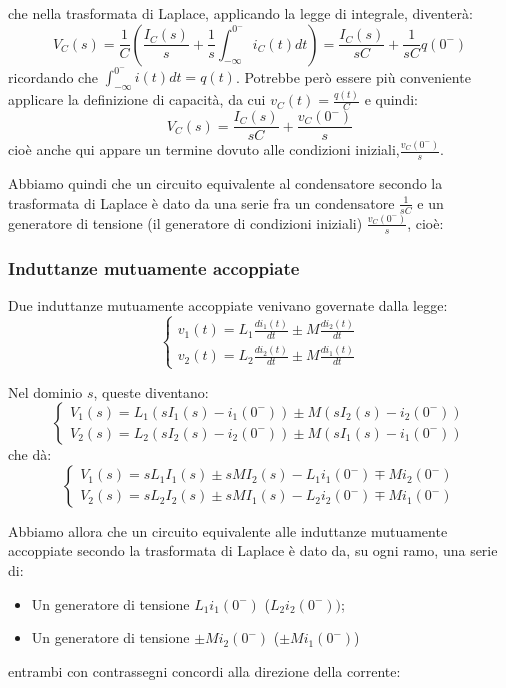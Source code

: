 \documentclass[a4paper,11pt]{article}
\begin{document}
che nella trasformata di Laplace, applicando la legge di integrale, diventerà:
$$
V_C(s) = \frac{1}{C} \left( \frac{I_C(s)}{s} + \frac{1}{s}\int_{-\infty}^{0^-}i_C(t)dt \right) = \frac{I_C(s)}{sC} + \frac{1}{sC} q(0^-)
$$
ricordando che $\int_{-\infty}^{0^-} i(t) dt = q(t)$.
Potrebbe però essere più conveniente applicare la definizione di capacità, da cui $v_C(t) = \frac{q(t)}{C}$ e quindi:
$$
V_C(s) = \frac{I_C(s)}{sC} + \frac{v_C(0^-)}{s}
$$
cioè anche qui appare un termine dovuto alle condizioni iniziali,$ \frac{v_C(0^-)}{s}$.

Abbiamo quindi che un circuito equivalente al condensatore secondo la trasformata di Laplace è dato da una serie fra un condensatore $\frac{1}{sC}$ e un generatore di tensione (il generatore di condizioni iniziali) $\frac{v_C(0^-)}{s}$, cioè:

\begin{center}
\end{center}

\subsubsection{Induttanze mutuamente accoppiate}
Due induttanze mutuamente accoppiate venivano governate dalla legge:
\[
	\begin{cases}			
		v_1(t) = L_1 \frac{d i_1(t)}{dt} \pm M \frac{d i_2(t)}{dt} \\
		v_2(t) = L_2 \frac{d i_2(t)}{dt} \pm M \frac{d i_1(t)}{dt}
	\end{cases}
\]

Nel dominio $s$, queste diventano:
\[
	\begin{cases}
		V_1(s) = L_1 \left( s I_1(s) - i_1(0^-) \right) \pm M \left( s I_2(s) - i_2(0^-) \right) \\
		V_2(s) = L_2 \left( s I_2(s) - i_2(0^-) \right) \pm M \left( s I_1(s) - i_1(0^-) \right)
	\end{cases}
\]
che dà:
\[
	\begin{cases}
		V_1(s) = s L_1 I_1(s) \pm s M I_2(s) - L_1 i_1(0^-) \mp M i_2(0^-) \\
		V_2(s) = s L_2 I_2(s) \pm s M I_1(s) - L_2 i_2(0^-) \mp M i_1(0^-)
	\end{cases}
\]

Abbiamo allora che un circuito equivalente alle induttanze mutuamente accoppiate secondo la trasformata di Laplace è dato da, su ogni ramo, una serie di:
\begin{itemize}
	\item Un generatore di tensione $L_1 i_1(0^-)$ ($L_2 i_2 (0^-))$;
	\item Un generatore di tensione $\pm M i_2(0^-)$ ($\pm M i_1(0^-)$)
\end{itemize}
entrambi con contrassegni concordi alla direzione della corrente:
\end{document}
